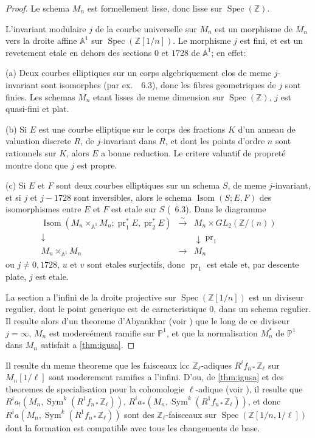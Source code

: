 \documentclass[11pt,reqno]{amsart}
\theoremstyle{plain}
\theoremstyle{remark}
\DeclareMathOperator{\Sym}{Sym}
\DeclareMathOperator{\Isom}{Isom}
\DeclareMathOperator{\Spec}{Spec}
\DeclareMathOperator{\pr}{pr}
\newcommand{\Z}{\mathbb{Z}}
\newcommand{\A}{\mathbb{A}}
\numberwithin{equation}{section}
\begin{document}
\begin{proof}
Le schema $M_n$ est formellement lisse, donc lisse sur $\Spec(\Z)$.

L'invariant modulaire $j$ de la courbe universelle sur $M_n$ est un morphisme de $M_n$ vers la droite affine $\A^1$ sur $\Spec(\Z[1/n])$. Le morphisme $j$ est fini, et est un revetement etale en dehors des sections $0$ et $1728$ de $\A^1$; en effet:

(a) Deux courbes elliptiques sur un corps algebriquement clos de meme $j$-invariant sont isomorphes (par ex.~\cite{Tate}~6.3), donc les fibres geometriques de $j$ sont finies. Les schemas $M_n$ etant lisses de meme dimension sur $\Spec(\Z)$, $j$ est quasi-fini et plat.

(b) Si $E$ est une courbe elliptique sur le corps des fractions $K$ d'un anneau de valuation discrete $R$, de $j$-invariant dans $R$, et dont les points d'ordre $n$ sont rationnels sur $K$, alors $E$ a bonne reduction. Le critere valuatif de propret\'e montre donc que $j$ est propre.

(c) Si $E$ et $F$ sont deux courbes elliptiques sur un schema $S$, de meme $j$-invariant, et si $j$ et $j-1728$ sont inversibles, alors le schema $\Isom(S; E, F)$ des isomorphismes entre $E$ et $F$ est etale sur $S$ (\cite{Tate}~6.3). Dans le diagramme
\[
\begin{array}{ccc}
\Isom(M_n \times_{\A^1} M_n; \pr_1^*E, \pr_2^*E) & \xrightarrow{\sim} & M_n \times GL_2(\Z/(n)) \\
\downarrow & & \downarrow \pr_1 \\
M_n \times_{\A^1} M_n & \longrightarrow & M_n
\end{array}
\]
ou $j \neq 0, 1728$, $u$ et $v$ sont etales surjectifs, donc $\pr_1$ est etale et, par descente plate, $j$ est etale.

La section a l'infini de la droite projective sur $\Spec(\Z[1/n])$ est un diviseur regulier, dont le point generique est de caracteristique $0$, dans un schema regulier. Il resulte alors d'un theoreme d'Abyankhar (voir \cite{Raynaud}) que le long de ce diviseur $j = \infty$, $M_n$ est modere\'ement ramifie sur $\mathbb{P}^1$, et que la normalisation $M_n^*$ de $\mathbb{P}^1$ dans $M_n$ satisfait a \ref{thm:igusa}.
\end{proof}

Il resulte du meme theoreme que les faisceaux lcc $\Z_\ell$-adiques $R^if_{n*}\Z_\ell$ sur $M_n[1/\ell]$ sont moderement ramifies a l'infini. D'ou, de \ref{thm:igusa} et des theoremes de specialisation pour la cohomologie $\ell$-adique (voir \cite{Raynaud}), il resulte que $R^i a_!(M_n, \Sym^k(R^1f_{n*}\Z_\ell))$, $R^i a_*(M_n, \Sym^k(R^1f_{n*}\Z_\ell))$, et donc $R^i a(M_n, \Sym^k(R^1f_{n*}\Z_\ell))$ sont des $\Z_\ell$-faisceaux sur $\Spec(\Z[1/n, 1/\ell])$ dont la formation est compatible avec tous les changements de base.
\end{document}
